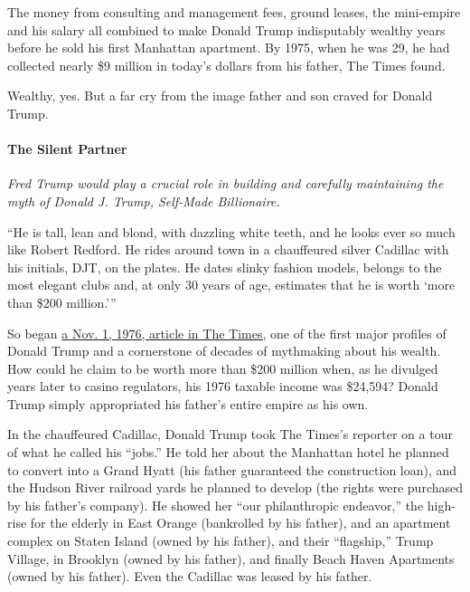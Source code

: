 The money from consulting and management fees, ground leases, the
mini-empire and his salary all combined to make Donald Trump
indisputably wealthy years before he sold his first Manhattan apartment.
By 1975, when he was 29, he had collected nearly \$9 million in today's
dollars from his father, The Times found.

Wealthy, yes. But a far cry from the image father and son craved for
Donald Trump.

\hypertarget{the-silent-partner}{%
\paragraph{The Silent Partner}\label{the-silent-partner}}

\emph{Fred Trump would play a crucial role in building and carefully
maintaining the myth of Donald J. Trump, Self-Made Billionaire.}

``He is tall, lean and blond, with dazzling white teeth, and he looks
ever so much like Robert Redford. He rides around town in a chauffeured
silver Cadillac with his initials, DJT, on the plates. He dates slinky
fashion models, belongs to the most elegant clubs and, at only 30 years
of age, estimates that he is worth `more than \$200 million.'''

So began
\href{https://www.nytimes.com/1976/11/01/archives/donald-trump-real-estate-promoter-builds-image-as-he-buys-buildings.html}{a
Nov. 1, 1976, article in The Times,} one of the first major profiles of
Donald Trump and a cornerstone of decades of mythmaking about his
wealth. How could he claim to be worth more than \$200 million when, as
he divulged years later to casino regulators, his 1976 taxable income
was \$24,594? Donald Trump simply appropriated his father's entire
empire as his own.

In the chauffeured Cadillac, Donald Trump took The Times's reporter on a
tour of what he called his ``jobs.'' He told her about the Manhattan
hotel he planned to convert into a Grand Hyatt (his father guaranteed
the construction loan), and the Hudson River railroad yards he planned
to develop (the rights were purchased by his father's company). He
showed her ``our philanthropic endeavor,'' the high-rise for the elderly
in East Orange (bankrolled by his father), and an apartment complex on
Staten Island (owned by his father), and their ``flagship,'' Trump
Village, in Brooklyn (owned by his father), and finally Beach Haven
Apartments (owned by his father). Even the Cadillac was leased by his
father.

